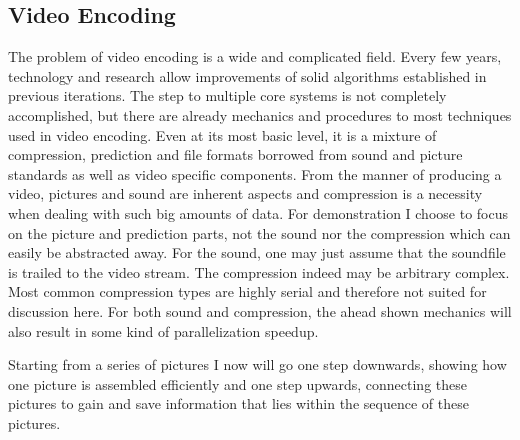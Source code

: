 \subsection{Video Encoding}
\label{subsec:video}
The problem of video encoding is a wide and complicated field. Every few years, technology and research allow improvements of solid algorithms established in previous iterations. The step to multiple core systems is not completely accomplished, but there are already mechanics and procedures to most techniques used in video encoding. Even at its most basic level, it is a mixture of compression, prediction and file formats borrowed from sound and picture standards as well as video specific components. From the manner of producing a video, pictures and sound are inherent aspects and compression is a necessity when dealing with such big amounts of data. For demonstration I choose to focus on the picture and prediction parts, not the sound nor the compression which can easily be abstracted away. For the sound, one may just assume that the soundfile is trailed to the video stream. The compression indeed may be arbitrary complex. Most common compression types are highly serial and therefore not suited for discussion here. For both sound and compression, the ahead shown mechanics will also result in some kind of parallelization speedup.

Starting from a series of pictures I now will go one step downwards, showing how one picture is assembled efficiently and one step upwards, connecting these pictures to gain and save information that lies within the sequence of these pictures.



